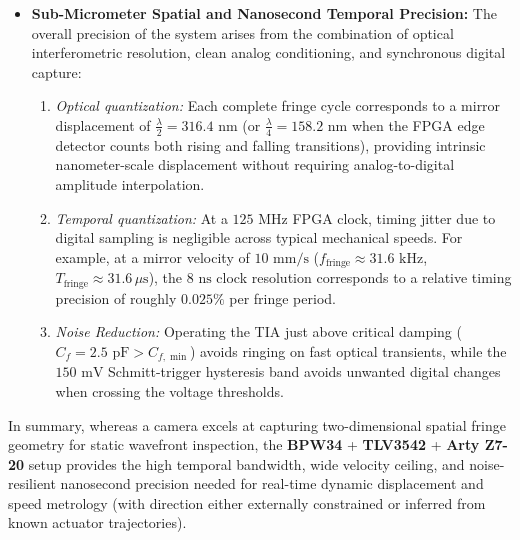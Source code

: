 \begin{itemize}
    \item \textbf{Sub-Micrometer Spatial and Nanosecond Temporal Precision:}
    The overall precision of the system arises from the combination of optical interferometric resolution, clean analog conditioning, and synchronous digital capture:
    \begin{enumerate}
        \item \textit{Optical quantization:} Each complete fringe cycle corresponds to a mirror displacement of $\frac{\lambda}{2} = 316.4\text{ nm}$ (or $\frac{\lambda}{4} = 158.2\text{ nm}$ when the FPGA edge detector counts both rising and falling transitions), providing intrinsic nanometer-scale displacement without requiring analog-to-digital amplitude interpolation.
        \item \textit{Temporal quantization:} At a $125\text{ MHz}$ FPGA clock, timing jitter due to digital sampling is negligible across typical mechanical speeds. For example, at a mirror velocity of $10\text{ mm/s}$ ($f_{\text{fringe}} \approx 31.6\text{ kHz}$, $T_{\text{fringe}} \approx 31.6\,\mu\text{s}$), the $8\text{ ns}$ clock resolution corresponds to a relative timing precision of roughly $0.025\%$ per fringe period.
        \item \textit{Noise Reduction:} Operating the TIA just above critical damping ($C_f = 2.5\text{ pF} > C_{f,\min}$) avoids ringing on fast optical transients, while the $150\text{ mV}$ Schmitt-trigger hysteresis band avoids unwanted digital changes when crossing the voltage thresholds.
    \end{enumerate}
\end{itemize}

In summary, whereas a camera excels at capturing two-dimensional spatial fringe geometry for static wavefront inspection, the \textbf{BPW34} + \textbf{TLV3542} + \textbf{Arty Z7-20} setup provides the high temporal bandwidth, wide velocity ceiling, and noise-resilient nanosecond precision needed for real-time dynamic displacement and speed metrology (with direction either externally constrained or inferred from known actuator trajectories).